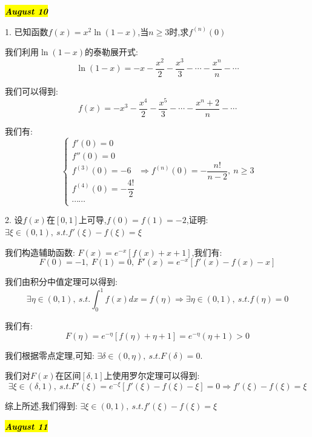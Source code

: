 \hl{\textbf{\textit{August 10}}}

1. 已知函数$f(x)=x^2\ln(1-x)$,当$n\geq 3$时,求$f^{(n)}(0)$
\begin{solution}

	我们利用$\ln(1-x)$的泰勒展开式:  
	$$\ln(1-x)=-x-\dfrac{x^2}{2}-\dfrac{x^3}{3}-\cdots-\dfrac{x^n}{n}-\cdots$$
	
	我们可以得到:  
	$$f(x)=-x^3-\dfrac{x^4}{2}-\dfrac{x^5}{3}-\cdots-\dfrac{x^n+2}{n}-\cdots$$
	
	我们有:  
	$$\left\lbrace
	\begin{array}{l}
		f'(0)=0\\
		f''(0)=0\\
		f^{(3)}(0)=-6\\
		f^{(4)}(0)=-\dfrac{4!}{2}\\
		\cdots\cdots
	\end{array}
	\right. \Rightarrow f^{(n)}(0)=-\dfrac{n!}{n-2},\ n\geq 3$$
\end{solution}

2. 设$f(x)$在$[0,1]$上可导,$f(0)=f(1)=-2$,证明:  $\exists \xi\in(0,1),\ s.t. f'(\xi)-f(\xi)=\xi$
\begin{solution}

	我们构造辅助函数:  $F(x)=e^{-x}\left[ f(x)+x+1\right]$,我们有:  
	$$F(0)=-1,\ F(1)=0,\ F'(x)=e^{-x}\left[ f'(x)-f(x)-x\right]$$
	
	我们由积分中值定理可以得到:  
	$$\exists \eta\in(0,1),\ s.t. \int_{0}^{1}f(x)dx=f(\eta)\Rightarrow \exists \eta\in(0,1),\ s.t. f(\eta)=0$$
	
	我们有:  
	$$F(\eta)=e^{-\eta}\left[ f(\eta)+\eta+1\right]=e^{-\eta}(\eta+1)>0$$
	
	我们根据零点定理,可知:  $\exists \delta\in(0,\eta),\ s.t. F(\delta)=0$.
	
	我们对$F(x)$在区间$[\delta,1]$上使用罗尔定理可以得到:  
	$$\exists\xi\in(\delta,1),\ s.t. F'(\xi)=e^{-\xi}\left[ f'(\xi)-f(\xi)-\xi\right]=0\Rightarrow f'(\xi)-f(\xi)=\xi$$
	
	综上所述,我们得到:  $\exists \xi\in(0,1),\ s.t. f'(\xi)-f(\xi)=\xi$
\end{solution}
\hl{\textbf{\textit{August 11}}}

